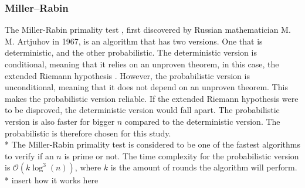 \documentclass[main.tex]{subfiles}
\begin{document}
\subsubsection{Miller–Rabin} \label{miller}
The Miller-Rabin primality test \cite{algh:miller}, first discovered by Russian
mathematician M. M. Artjuhov in 1967, is an algorithm that has two versions. One
that is deterministic, and the other probabilistic. The deterministic version is
conditional, meaning that it relies on an unproven theorem, in this case, the
extended Riemann hypothesis \cite{riemann}. However, the probabilistic version
is unconditional, meaning that it does not depend on an unproven theorem. This
makes the probabilistic version reliable. If the extended Riemann hypothesis
were to be disproved, the deterministic version would fall apart. The
probabilistic version is also faster for bigger $n$ compared to the
deterministic version. The probabilistic is therefore chosen for this study.
\newline
\\*
The Miller-Rabin primality test is considered to be one of the fastest
algorithms to verify if an $n$ is prime or not. The time complexity for the
probabilistic version is $\mathcal{O}(k \log^{3}(n))$, where $k$ is the amount of rounds
the algorithm will perform. \newline
\\*
insert how it works here
\end{document}
